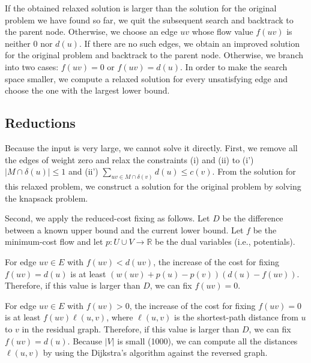 \documentclass{article}
\newcommand{\R}{\mathbb{R}}
\begin{document}
If the obtained relaxed solution is larger than the solution for the original problem we have found so far, we quit the subsequent search and backtrack to the parent node.
Otherwise, we choose an edge $uv$ whose flow value $f(uv)$ is neither $0$ nor $d(u)$.
If there are no such edges, we obtain an improved solution for the original problem and backtrack to the parent node.
Otherwise, we branch into two cases: $f(uv)=0$ or $f(uv)=d(u)$.
In order to make the search space smaller, we compute a relaxed solution for every unsatisfying edge and choose the one with the largest lower bound.

\subsection{Reductions}

Because the input is very large, we cannot solve it directly.
First, we remove all the edges of weight zero and relax the constraints (i) and (ii) to (i') $|M\cap \delta(u)|\leq 1$ and (ii') $\sum_{uv\in M\cap\delta(v)}d(u)\leq c(v)$.
From the solution for this relaxed problem, we construct a solution for the original problem by solving the knapsack problem.

Second, we apply the reduced-cost fixing as follows.
Let $D$ be the difference between a known upper bound and the current lower bound.
Let $f$ be the minimum-cost flow and let $p:U\cup V\to\R$ be the dual variables (i.e., potentials).

For edge $uv\in E$ with $f(uv)<d(uv)$, the increase of the cost for fixing $f(uv)=d(u)$ is at least $(w(uv)+p(u)-p(v))(d(u)-f(uv))$.
Therefore, if this value is larger than $D$, we can fix $f(uv)=0$.

For edge $uv\in E$ with $f(uv)>0$, the increase of the cost for fixing $f(uv)=0$ is at least $f(uv)\ell(u,v)$, where $\ell(u,v)$ is the shortest-path distance from $u$ to $v$ in the residual graph.
Therefore, if this value is larger than $D$, we can fix $f(uv)=d(u)$.
Because $|V|$ is small (1000), we can compute all the distances $\ell(u,v)$ by using the Dijkstra's algorithm against the reversed graph.
\end{document}
